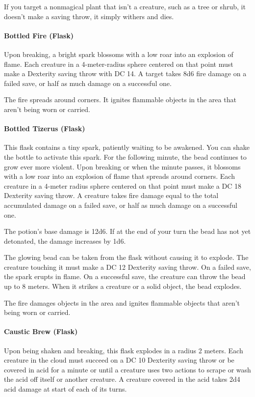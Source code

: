         If you target a nonmagical plant that isn't a creature, such as a tree or shrub, it doesn't make a saving throw, it simply withers and dies.
    \paragraph{Bottled Fire (Flask)} %
        Upon breaking, a bright spark blossoms with a low roar into an explosion of flame.
        Each creature in a 4-meter-radius sphere centered on that point must make a Dexterity saving throw with DC 14.
        A target takes 8d6 fire damage on a failed save, or half as much damage on a successful one.

        The fire spreads around corners.
        It ignites flammable objects in the area that aren't being worn or carried.
    \paragraph{Bottled Tizerus (Flask)} %
        This flask contains a tiny spark, patiently waiting to be awakened.
        You can shake the bottle to activate this spark.
        For the following minute, the bead continues to grow ever more violent.
        Upon breaking or when the minute passes, it blossoms with a low roar into an explosion of flame that spreads around corners.
        Each creature in a 4-meter radius sphere centered on that point must make a DC 18 Dexterity saving throw.
        A creature takes fire damage equal to the total accumulated damage on a failed save, or half as much damage on a successful one.

        The potion's base damage is 12d6.
        If at the end of your turn the bead has not yet detonated, the damage increases by 1d6.

        The glowing bead can be taken from the flask without causing it to explode.
        The creature touching it must make a DC 12 Dexterity saving throw.
        On a failed save, the spark erupts in flame.
        On a successful save, the creature can throw the bead up to 8 meters.
        When it strikes a creature or a solid object, the bead explodes.

        The fire damages objects in the area and ignites flammable objects that aren't being worn or carried.
    \paragraph{Caustic Brew (Flask)} %
        Upon being shaken and breaking, this flask explodes in a radius 2 meters.
        Each creature in the cloud must succeed on a DC 10 Dexterity saving throw or be covered in acid for a minute or until a creature uses two actions to scrape or wash the acid off itself or another creature.
        A creature covered in the acid takes 2d4 acid damage at start of each of its turns.

